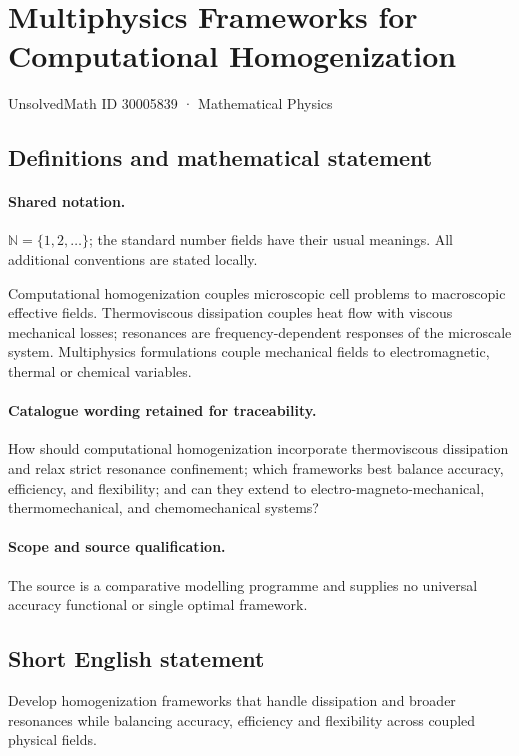 \documentclass[11pt]{article}
\begin{document}
\setcounter{section}{30005838}
\section{Multiphysics Frameworks for Computational Homogenization}\label{30005839}
{\small UnsolvedMath ID 30005839 · Mathematical Physics}
\subsection{Definitions and mathematical statement}

\paragraph{Shared notation.}$\mathbb N=\{1,2,\ldots\}$; the standard number fields have their usual meanings. All additional conventions are stated locally.


Computational homogenization couples microscopic cell problems to macroscopic effective fields. Thermoviscous dissipation couples heat flow with viscous mechanical losses; resonances are frequency-dependent responses of the microscale system. Multiphysics formulations couple mechanical fields to electromagnetic, thermal or chemical variables.

\paragraph{Catalogue wording retained for traceability.}
How should computational homogenization incorporate thermoviscous dissipation and relax strict resonance confinement; which frameworks best balance accuracy, efficiency, and flexibility; and can they extend to electro-magneto-mechanical, thermomechanical, and chemomechanical systems?

\paragraph{Scope and source qualification.}The source is a comparative modelling programme and supplies no universal accuracy functional or single optimal framework.
\subsection{Short English statement}
Develop homogenization frameworks that handle dissipation and broader resonances while balancing accuracy, efficiency and flexibility across coupled physical fields.
\end{document}
